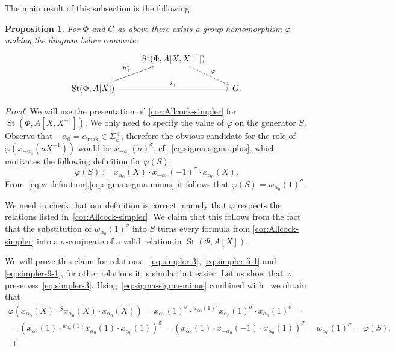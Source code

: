\documentclass[oneside, 10pt]{amsart}
\DeclareMathOperator{\St}{St}
\newcommand{\inv}{^{-1}}
\numberwithin{equation}{section}
\numberwithin{thm}{section}
\numberwithin{lemma}{section}
\newtheorem{prop}[lemma]{Proposition}
\theoremstyle{definition}
\theoremstyle{remark}
\begin{document}
The main result of this subsection is the following
\begin{prop} \label{prop:rel-poly-Laurent}
For $\Phi$ and $G$ as above there exists a group homomorphism $\varphi$ making the diagram below commute:
\[\begin{tikzcd} & \St(\Phi, A[X, X\inv]) \arrow[rd, dashrightarrow, "\varphi"] & \\
\St(\Phi, A[X]) \arrow{ru}{h_+^*} \arrow{rr}{i_+} & & G.
\end{tikzcd}\]
\end{prop}
\begin{proof}
We will use the presentation of~\cref{cor:Allcock-simpler} for $\St(\Phi, A[X, X\inv])$.
We only need to specify the value of $\varphi$ on the generator $S$.
Observe that $-\alpha_0 = \alpha_{\max} \in \Sigma_k^+$, therefore the obvious candidate for the role of $\varphi(x_{-\alpha_0}(aX\inv))$ would be $x_{-\alpha_0}(a)^\sigma$, cf.~\eqref{eq:sigma-sigma-plus},
which motivates the following definition for $\varphi(S)$:
\[\varphi(S) := x_{\alpha_0}(X) \cdot x_{-\alpha_0}(-1)^\sigma \cdot x_{\alpha_0}(X).\]
From~\eqref{eq:w-definition},\eqref{eq:sigma-sigma-minus} it follows that $\varphi(S) = w_{\alpha_0}(1)^\sigma$.

We need to check that our definition is correct, namely that $\varphi$ respects the relations listed in~\cref{cor:Allcock-simpler}.
We claim that this follows from the fact that the substitution of $w_{\alpha_0}(1)^\sigma$ into $S$ turns every formula from \cref{cor:Allcock-simpler}
into a $\sigma$-conjugate of a valid relation in $\St(\Phi, A[X])$.

We will prove this claim for relations~~\eqref{eq:simpler-3}, \eqref{eq:simpler-5-1} and \eqref{eq:simpler-9-1}, for other relations it is similar but easier.
Let us show that $\varphi$ preserves~\eqref{eq:simpler-3}.
Using~\eqref{eq:sigma-sigma-minus} combined with~\cite[Lemma~5.1b]{Ma69} we obtain that
\begin{multline*}
\varphi(x_{\alpha_0}(X) \cdot {}^{S} x_{\alpha_0}(X) \cdot x_{\alpha_0}(X)) = x_{\alpha_0}(1)^\sigma \cdot {}^{w_{\alpha_0}(1)^\sigma} x_{\alpha_0}(1)^\sigma \cdot x_{\alpha_0}(1)^\sigma = \\
= \left( x_{\alpha_0}(1) \cdot {}^{w_{\alpha_0}(1)} x_{\alpha_0}(1) \cdot x_{\alpha_0}(1)\right)^\sigma = \left(x_{\alpha_0}(1) \cdot x_{-\alpha_0}(-1) \cdot x_{\alpha_0}(1)\right)^\sigma = w_{\alpha_0}(1)^\sigma = \varphi(S).
\end{multline*}


\end{proof}
\end{document}
